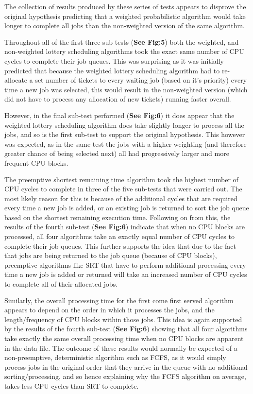 \documentclass{acm_proc_article-sp}
\begin{document}
The collection of results produced by these series of tests appears to disprove the original hypothesis predicting that a weighted probabilistic algorithm would take longer to complete all jobs than the non-weighted version of the same algorithm. 

Throughout all of the first three sub-tests (\textbf{See Fig:5}) both the weighted, and non-weighted lottery scheduling algorithms took the exact same number of CPU cycles to complete their job queues. This was surprising as it was initially predicted that because the weighted lottery scheduling algorithm had to re-allocate a set number of tickets to every waiting job (based on it's priority) every time a new job was selected, this would result in the non-weighted version (which did not have to process any allocation of new tickets) running faster overall. 

However, in the final sub-test performed (\textbf{See Fig:6}) it does appear that the weighted lottery scheduling algorithm does take slightly longer to process all the jobs, and so is the first sub-test to support the original hypothesis. This however was expected, as in the same test the jobs with a higher weighting (and therefore greater chance of being selected next) all had progressively larger and more frequent CPU blocks. 

The preemptive shortest remaining time algorithm took the highest number of CPU cycles to complete in three of the five sub-tests that were carried out. The most likely reason for this is because of the additional cycles that are required every time a new job is added, or an existing job is returned to sort the job queue based on the shortest remaining execution time. Following on from this, the results of the fourth sub-test (\textbf{See Fig:6}) indicate that when no CPU blocks are processed, all four algorithms take an exactly equal number of CPU cycles to complete their job queues. This further supports the idea that due to the fact that jobs are being returned to the job queue (because of CPU blocks), preemptive algorithms like SRT that have to perform additional processing every time a new job is added or returned will take an increased number of CPU cycles to complete all of their allocated jobs.  

Similarly, the overall processing time for the first come first served algorithm appears to depend on the order in which it processes the jobs, and the length/frequency of CPU blocks within those jobs. This idea is again supported by the results of the fourth sub-test (\textbf{See Fig:6}) showing that all four algorithms take exactly the same overall processing time when no CPU blocks are apparent in the data file. The outcome of these results would normally be expected of a non-preemptive, deterministic algorithm such as FCFS, as it would simply process jobs in the original order that they arrive in the queue with no additional sorting/processing, and so hence explaining why the FCFS algorithm on average, takes less CPU cycles than SRT to complete.
\end{document}
